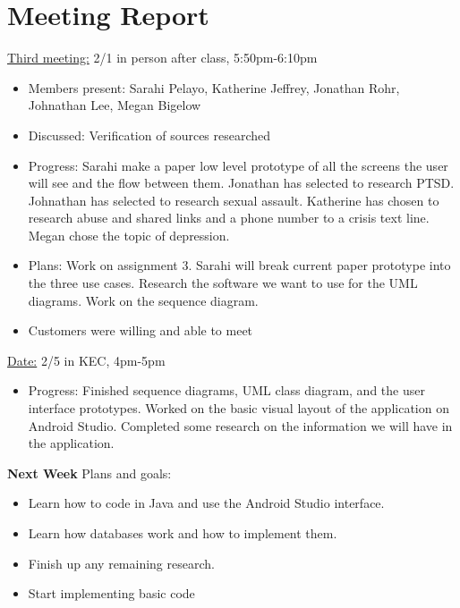 \documentclass[letterpaper,12pt,titlepage]{article}
\begin{document}
\section{Meeting Report}
\underline{Third meeting:} 2/1 in person after class, 5:50pm-6:10pm
\begin{itemize}
\item Members present: Sarahi Pelayo, Katherine Jeffrey, Jonathan Rohr, Johnathan Lee, Megan Bigelow
\item Discussed: Verification of sources researched 
\item Progress: Sarahi make a paper low level prototype of all the screens the user will see and the flow between them. Jonathan has selected to research PTSD. Johnathan has selected to research sexual assault. Katherine has chosen to research abuse and shared links and a phone number to a crisis text line. Megan chose the topic of depression.
\item Plans: Work on assignment 3. Sarahi will break current paper prototype into the three use cases. Research the software we want to use for the UML diagrams. Work on the sequence diagram. 
\item Customers were willing and able to meet 
\end{itemize}
\newpage
\noindent
\underline{Date:} 2/5 in KEC, 4pm-5pm
\begin{itemize}
\item Progress: Finished sequence diagrams, UML class diagram, and the user interface prototypes. Worked on the basic visual layout of the application on Android Studio. Completed some research on the information we will have in the application.
\end{itemize}

\noindent
\textbf{Next Week}
\newline
\newline
Plans and goals:
\begin{itemize}
\item Learn how to code in Java and use the Android Studio interface.
\item Learn how databases work and how to implement them.
\item Finish up any remaining research.
\item Start implementing basic code
\end{itemize}
\newpage



\end{document}
